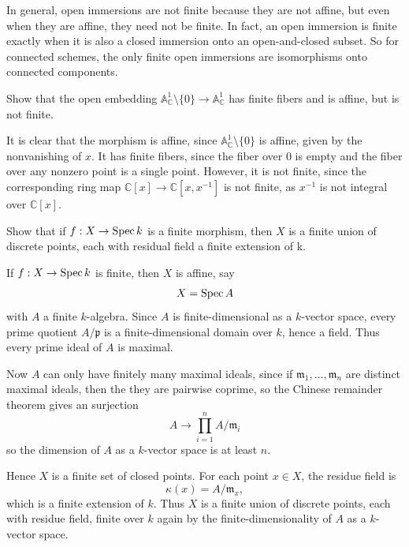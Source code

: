 \documentclass[12pt]{article}
\begin{document}
In general, open immersions are not finite because they are not affine, but even when they are affine, they need not be finite. In fact, an open immersion is finite exactly when it is also a closed immersion onto an open-and-closed subset. So for connected schemes, the only finite open immersions are isomorphisms onto connected components.

\begin{exercise}
    Show that the open embedding $\mathbb A^1_{\mathbb C} \setminus \{0\} \to \mathbb A^1_{\mathbb C}$ has finite fibers and is affine, but is not finite.
\end{exercise}

\begin{solution}
    It is clear that the morphism is affine, since $\mathbb A^1_{\mathbb C} \setminus \{0\}$ is affine, given by the nonvanishing of $x$. It has finite fibers, since the fiber over $0$ is empty and the fiber over any nonzero point is a single point. However, it is not finite, since the corresponding ring map $\mathbb C[x] \to \mathbb C[x,x^{-1}]$ is not finite, as $x^{-1}$ is not integral over $\mathbb C[x]$.
\end{solution}

\begin{exercise}
    Show that if $f:X\to \operatorname{Spec} k$ is a finite morphism, then $X$ is a finite union of discrete points, each with residual field a finite extension of k.
\end{exercise}

\begin{solution}
    If $f:X\to \operatorname{Spec} k$ is finite, then $X$ is affine, say
    \[
        X=\operatorname{Spec} A
    \]
    with $A$ a finite $k$-algebra. Since $A$ is finite-dimensional as a $k$-vector space, every prime quotient $A/\mathfrak p$ is a finite-dimensional domain over $k$, hence a field. Thus every prime ideal of $A$ is maximal.

    Now $A$ can only have finitely many maximal ideals, since if $\mathfrak m_1,\dots,\mathfrak m_n$ are distinct maximal ideals, then the they are pairwise coprime, so the Chinese remainder theorem gives an surjection
    \[A\to \prod_{i=1}^n A/\mathfrak m_i\]
    so the dimension of $A$ as a $k$-vector space is at least $n$.

    Hence $X$ is a finite set of closed points. For each point $x\in X$, the residue field is
    \[
        \kappa(x)=A/\mathfrak m_x,
    \]
    which is a finite extension of $k$. Thus $X$ is a finite union of discrete points, each with residue field, finite over $k$ again by the finite-dimensionality of $A$ as a $k$-vector space.
\end{solution}
\end{document}
